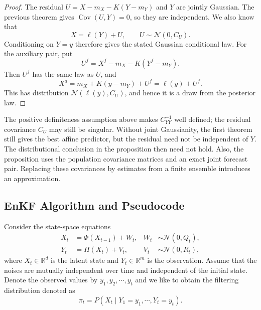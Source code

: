 \begin{proof}
The residual $U=X-m_X-K(Y-m_Y)$ and $Y$ are jointly Gaussian.
The previous theorem gives $\operatorname{Cov}(U,Y)=0$, so they are
independent. We also know that
\[
    X=\ell(Y)+U,\qquad U\sim\mathcal N(0,C_U).
\]
Conditioning on $Y=y$ therefore gives the stated Gaussian conditional
law. For the auxiliary pair, put
\[
    U^f=X^f-m_X-K(Y^f-m_Y).
\]
Then $U^f$ has the same law as $U$, and
\[
    X^a=m_X+K(y-m_Y)+U^f=\ell(y)+U^f.
\]
This has distribution $\mathcal N(\ell(y),C_U)$, and hence it is a draw
from the posterior law.
\end{proof}

The positive definiteness assumption above makes $C_{YY}^{-1}$
well defined; the residual covariance $C_U$ may still be singular.
Without joint Gaussianity, the first theorem still gives the best
affine predictor, but the residual need not be independent of $Y$.
The distributional conclusion in the proposition then need not hold.
Also, the proposition uses the population covariance matrices and an
exact joint forecast pair. Replacing these covariances by estimates
from a finite ensemble introduces an approximation.


\subsection{EnKF Algorithm and Pseudocode}

\begin{definition}
    Consider the state-space equations
\[
\begin{aligned}
X_t &= \Phi(X_{t-1}) + W_t,
& W_t &\sim \mathcal N(0,Q_t),\\
Y_t &= H(X_t) + V_t,
& V_t &\sim \mathcal N(0,R_t),
\end{aligned}
\]
where $X_t\in\mathbb R^d$ is the latent state and
$Y_t\in\mathbb R^m$ is the observation. Assume that the noises are
mutually independent over time and independent of the initial state.
Denote the observed values by $y_{1},y_2,\cdots,y_t$ and we like to obtain the filtering distribution denoted as
\[
\pi_t=P(X_t\mid Y_1=y_1,\cdots,Y_t = y_t).
\]
\end{definition}

